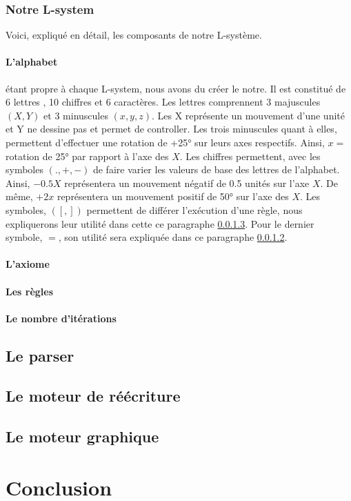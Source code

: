 \documentclass[12pt]{article}
\begin{document}
\subsubsection{Notre L-system}
Voici, expliqué en détail, les composants de notre L-système. 
\paragraph{L'alphabet}\label{alpha} étant propre à chaque L-system, nous avons du créer le notre.
Il est constitué de 6 lettres , 10 chiffres et 6 caractères.
Les lettres comprennent 3 majuscules $(X,Y)$ et 3 minuscules $(x,y,z)$.
Les X représente un mouvement d'une unité et Y ne dessine pas et permet de controller.
Les trois minuscules quant à elles, permettent d'effectuer une rotation de +25° sur leurs axes respectifs.
Ainsi, $x = $ rotation de 25° par rapport à l'axe des $X$.
Les chiffres permettent, avec les symboles $(.,+,-)$ de faire varier les valeurs de base des lettres de l'alphabet.
Ainsi, $-0.5X$ représentera un mouvement négatif de 0.5 unités sur l'axe $X$.
De même, $+2x$ représentera un mouvement positif de 50° sur l'axe des $X$.
Les symboles, $([,])$ permettent de différer l'exécution d'une règle, nous expliquerons leur utilité dans cette ce paragraphe \ref{rules}. Pour le dernier symbole, $=$, son utilité sera expliquée dans ce paragraphe \ref{axiome}.
\paragraph{L'axiome}\label{axiome}
\paragraph{Les règles}\label{rules}
\paragraph{Le nombre d'itérations}\label{nbIt}
\subsection{Le parser}
\label{parser}
\subsection{Le moteur de réécriture}
\label{rw-engine}
\subsection{Le moteur graphique}
\label{g-engine}





\section{Conclusion}
\end{document}
